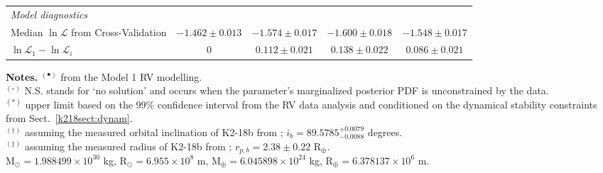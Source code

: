 \begin{landscape}
\begin{table*}
\begin{tabular}{lcccc}
\emph{Model diagnostics} & & & \\
Median $\ln{\mathcal{L}}$ from Cross-Validation & $-1.462 \pm 0.013$ & $-1.574 \pm 0.017$ & $-1.600 \pm 0.018$ & $-1.548 \pm 0.017$ \\
$\ln{\mathcal{L}_1} - \ln{\mathcal{L}_i}$ & 0 & $0.112 \pm 0.021$ & $0.138 \pm 0.022$ & $0.086 \pm 0.021$ \\
\end{tabular}
\begin{list}{}{}
\item {\bf{Notes.}} $^{(\bullet)}$ from the Model 1 RV modelling. \\
  $^{(\circ)}$ N.S. stands for `no solution' and occurs when the parameter's marginalized posterior 
  PDF is unconstrained by the data. \\
  $^{(\ast)}$ upper limit based on the 99\% confidence interval from the RV data analysis and 
  conditioned on the dynamical stability constraints from Sect.~\ref{k218sect:dynam}. \\
  $^{(\dagger)}$ assuming the measured orbital inclination of K2-18b from ;
  $i_b = 89.5785^{+0.0079}_{-0.0088}$ degrees. \\
  $^{(\ddagger)}$ assuming the measured radius of K2-18b from ;
  $r_{p,b} = 2.38 \pm 0.22$ R$_{\oplus}$. \\
  M$_{\odot} = 1.988499 \times 10^{30}$ kg, R$_{\odot} = 6.955 \times 10^{8}$ m, M$_{\oplus} = 6.045898 \times 10^{24}$ kg, R$_{\oplus} = 6.378137 \times 10^{6}$ m.
\end{list}
\end{table*}
\clearpage
\end{landscape}

